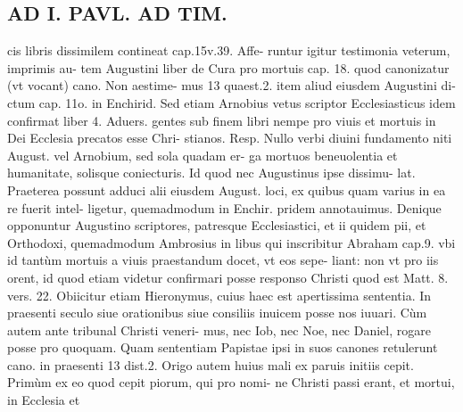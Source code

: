\documentclass{article}
\begin{document}
\begin{pages}
\section*{AD I. PAVL. AD TIM. }
\marginpar{[ p.46 ]}\pstart cis libris dissimilem contineat cap.15v.39. Affe- runtur igitur testimonia veterum, imprimis au- tem Augustini liber  de Cura pro mortuis cap. 18. quod canonizatur (vt vocant) cano. Non aestime- mus 13 quaest.2. item aliud eiusdem Augustini di- ctum cap. 11o. in Enchirid. Sed etiam Arnobius vetus scriptor Ecclesiasticus idem confirmat liber  4. Aduers. gentes sub finem libri nempe pro viuis et mortuis in Dei Ecclesia precatos esse Chri- stianos. Resp. Nullo verbi diuini fundamento niti August. vel Arnobium, sed sola quadam er- ga mortuos beneuolentia et humanitate, solisque coniecturis. Id quod nec Augustinus ipse dissimu- lat. Praeterea possunt adduci alii eiusdem August. loci, ex quibus quam varius in ea re fuerit intel- ligetur, quemadmodum in Enchir. pridem annotauimus. Denique opponuntur Augustino scriptores, patresque Ecclesiastici, et ii quidem pii, et Orthodoxi, quemadmodum Ambrosius in libus  qui inscribitur Abraham cap.9. vbi id tantùm mortuis a viuis praestandum docet, vt eos sepe- liant: non vt pro iis orent, id quod etiam videtur confirmari posse responso Christi quod est Matt. 8. vers. 22. Obiicitur etiam Hieronymus, cuius haec est apertissima sententia. In praesenti seculo siue orationibus siue consiliis inuicem posse nos iuuari. Cùm autem ante tribunal Christi veneri- mus, nec Iob, nec Noe, nec Daniel, rogare posse pro quoquam. Quam sententiam Papistae ipsi in suos canones retulerunt cano. in praesenti 13 dist.2.  \pend\pstart Origo autem huius mali ex paruis initiis cepit. Primùm ex eo quod cepit piorum, qui pro nomi- ne Christi passi erant, et mortui, in Ecclesia et  \pend

\end{pages}
\end{document}
